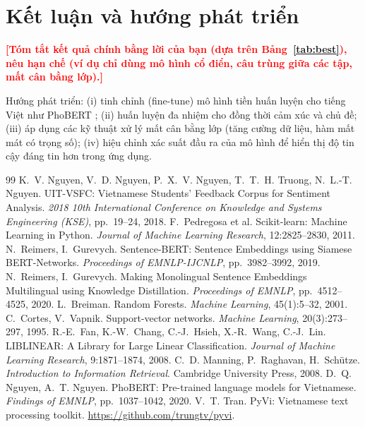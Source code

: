 \documentclass[12pt,a4paper]{article}
\newcommand{\todo}[1]{\textcolor{red}{\textbf{[#1]}}}
\begin{document}
\section{Kết luận và hướng phát triển}
\todo{Tóm tắt kết quả chính bằng lời của bạn (dựa trên Bảng~\ref{tab:best}), nêu hạn chế (ví dụ chỉ dùng mô hình cổ điển, câu trùng giữa các tập, mất cân bằng lớp).}

Hướng phát triển: (i) tinh chỉnh (fine-tune) mô hình tiền huấn luyện cho tiếng Việt như PhoBERT \cite{nguyen2020phobert};
(ii) huấn luyện đa nhiệm cho đồng thời cảm xúc và chủ đề; (iii) áp dụng các kỹ thuật xử lý mất cân bằng lớp (tăng cường dữ liệu, hàm mất mát có trọng số);
(iv) hiệu chỉnh xác suất đầu ra của mô hình để hiển thị độ tin cậy đáng tin hơn trong ứng dụng.

\begin{thebibliography}{99}
 K.~V. Nguyen, V.~D. Nguyen, P.~X.~V. Nguyen, T.~T.~H. Truong, N.~L.-T. Nguyen.
  UIT-VSFC: Vietnamese Students' Feedback Corpus for Sentiment Analysis.
  \emph{2018 10th International Conference on Knowledge and Systems Engineering (KSE)}, pp.~19--24, 2018.
 F.~Pedregosa et al. Scikit-learn: Machine Learning in Python.
  \emph{Journal of Machine Learning Research}, 12:2825--2830, 2011.
 N.~Reimers, I.~Gurevych. Sentence-BERT: Sentence Embeddings using Siamese BERT-Networks.
  \emph{Proceedings of EMNLP-IJCNLP}, pp.~3982--3992, 2019.
 N.~Reimers, I.~Gurevych. Making Monolingual Sentence Embeddings Multilingual using Knowledge Distillation.
  \emph{Proceedings of EMNLP}, pp.~4512--4525, 2020.
 L.~Breiman. Random Forests. \emph{Machine Learning}, 45(1):5--32, 2001.
 C.~Cortes, V.~Vapnik. Support-vector networks. \emph{Machine Learning}, 20(3):273--297, 1995.
 R.-E.~Fan, K.-W.~Chang, C.-J.~Hsieh, X.-R.~Wang, C.-J.~Lin. LIBLINEAR: A Library for Large Linear Classification.
  \emph{Journal of Machine Learning Research}, 9:1871--1874, 2008.
 C.~D. Manning, P.~Raghavan, H.~Schütze. \emph{Introduction to Information Retrieval}. Cambridge University Press, 2008.
 D.~Q. Nguyen, A.~T. Nguyen. PhoBERT: Pre-trained language models for Vietnamese.
  \emph{Findings of EMNLP}, pp.~1037--1042, 2020.
 V.~T. Tran. PyVi: Vietnamese text processing toolkit. \url{https://github.com/trungtv/pyvi}.
\end{thebibliography}
\end{document}
